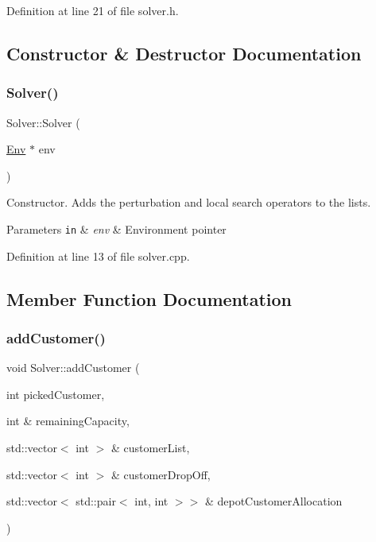 Definition at line 21 of file solver.\+h.



\subsection{Constructor \& Destructor Documentation}
\mbox{\label{class_solver_a05ec0ef6028f51c1eba417b41a14c2ea}} 
\subsubsection{\texorpdfstring{Solver()}{Solver()}}
{\footnotesize\ttfamily Solver\+::\+Solver (\begin{DoxyParamCaption}\item[{\hyperlink{class_env}{Env} $\ast$}]{env }\end{DoxyParamCaption})}



Constructor. Adds the perturbation and local search operators to the lists. 


\begin{DoxyParams}[1]{Parameters}
\mbox{\tt in}  & {\em env} & Environment pointer \\
\hline
\end{DoxyParams}


Definition at line 13 of file solver.\+cpp.



\subsection{Member Function Documentation}
\mbox{\label{class_solver_a943fbc40cc9d9ede517db697f5f971e9}} 
\subsubsection{\texorpdfstring{add\+Customer()}{addCustomer()}}
{\footnotesize\ttfamily void Solver\+::add\+Customer (\begin{DoxyParamCaption}\item[{int}]{picked\+Customer,  }\item[{int \&}]{remaining\+Capacity,  }\item[{std\+::vector$<$ int $>$ \&}]{customer\+List,  }\item[{std\+::vector$<$ int $>$ \&}]{customer\+Drop\+Off,  }\item[{std\+::vector$<$ std\+::pair$<$ int, int $>$$>$ \&}]{depot\+Customer\+Allocation }\end{DoxyParamCaption})\hspace{0.3cm}{\ttfamily [private]}}



